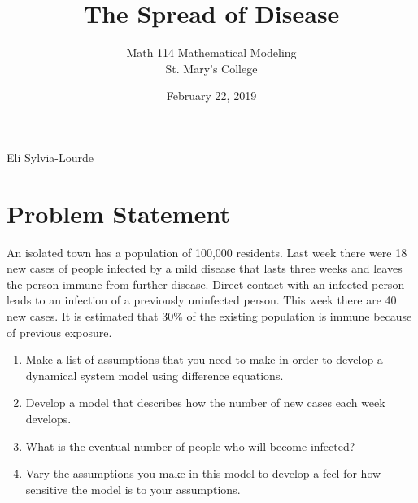 \documentclass[12pt]{article} %
\title{The Spread of Disease}
\author{Math 114 Mathematical Modeling\\St. Mary's College}
\date{February 22, 2019}
\newcommand{\authors}{Eli Sylvia-Lourde}
\begin{document}
\hfill\authors %
{\let\newpage\relax\maketitle} %

\section*{Problem Statement}
An	isolated	town	has	a	population	of	100,000	residents.	Last	week	there	were	18 new	cases	of
people	infected	by	a	mild	disease	that	lasts three	weeks and	leaves	the	person	immune	from
further	disease.	Direct	contact	with	an	infected person	leads	to	an	infection	of	a	previously
uninfected	person.	This	week	there	are	40 new	cases.	It	is	estimated	that	30\% of	the	existing
population	is	immune	because	of	previous	exposure.

\begin{enumerate}
\item
Make	a	list	of	assumptions	that	you	need	to	make	in	order	to	develop	a	dynamical
system	model	using	difference	equations.
\item
Develop	a	model	that	describes	how	the	number	of	new	cases	each	week	develops.
\item
What	is	the	eventual number	of	people	who	will	become	infected?
\item
Vary	the	assumptions	you	make	in	this	model	to	develop	a	feel	for	how	sensitive	the
model	is	to	your	assumptions.
\end{enumerate}
\end{document}
